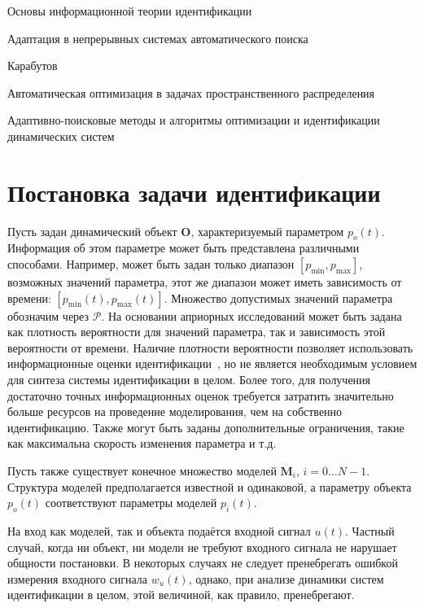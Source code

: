 Основы информационной теории идентификации~\cite{info_cipkin,straton_inf,karabut}

Адаптация в непрерывных системах автоматического поиска~\cite{adopt_cont_sys}

Карабутов~\cite{karabutov_adapt_id_sys,saliga_id_ctl_black}

Автоматическая оптимизация в задачах пространственного распределения~\cite{auto_optim_intask}

Адаптивно-поисковые методы и алгоритмы оптимизации и идентификации динамических систем~\cite{mich_92}



\section{Постановка задачи идентификации}  %

Пусть задан динамический объект $ \mathbf{O}$, характеризуемый параметром $p_o(t)$.
Информация об этом параметре может быть представлена
различными способами. Например, может быть задан только диапазон
$[p_{\min}, p_{\max}]$,
возможных значений параметра,
этот же диапазон может иметь зависимость от времени:
$[p_{\min}(t), p_{\max}(t)]$.
Множество допустимых значений параметра обозначим через $\mathcal{P}$.
На основании априорных исследований может
быть задана как плотность вероятности для значений параметра,
так и зависимость этой вероятности от времени. Наличие плотности вероятности
позволяет использовать информационные оценки идентификации~\cite{info_cipkin,atu_asau10},
но не является необходимым условием для синтеза системы идентификации в целом.
Более того, для получения достаточно точных информационных оценок
требуется затратить значительно больше ресурсов на проведение моделирования,
чем на собственно идентификацию.
Также могут быть заданы дополнительные ограничения, такие как максимальна скорость
изменения параметра и т.д.

Пусть также существует конечное множество моделей
\label{atu:d:N}$\mathbf{M}_i$, $i=0 \ldots N-1$.
Структура моделей предполагается известной и одинаковой,
а параметру объекта $p_o(t)$ соответствуют параметры моделей $p_{i}(t)$.

На вход как моделей, так и объекта подаётся входной сигнал \label{atu:d:u}$u(t)$.
Частный случай, когда ни объект, ни модели не требуют входного сигнала
не нарушает общности постановки. В некоторых случаях
не следует пренебрегать ошибкой измерения входного сигнала $w_u(t)$,
однако, при анализе динамики систем идентификации в целом,
этой величиной, как правило, пренебрегают.

